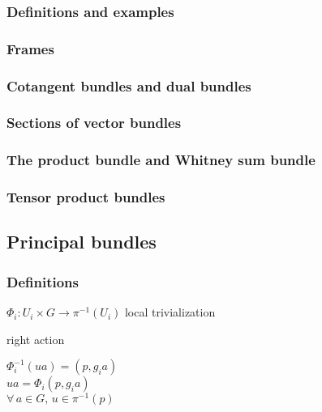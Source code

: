 \documentclass[twoside]{amsart}
\begin{document}
\subsubsection{ Definitions and examples }



\subsubsection{ Frames }


\subsubsection{ Cotangent bundles and dual bundles }



\subsubsection{ Sections of vector bundles }



\subsubsection{ The product bundle and Whitney sum bundle }



\subsubsection{ Tensor product bundles }




\subsection{ Principal bundles }




\subsubsection{ Definitions }

$\Phi_i: U_i \times G \to \pi^{-1}(U_i)$ local trivialization

right action

$\Phi_i^{-1}(ua) = (p,g_i a) $ \\
$ua = \Phi_i(p,g_i a)$ \\
$\forall \, a \in G, \, u \in \pi^{-1}(p)$ \\
\end{document}
